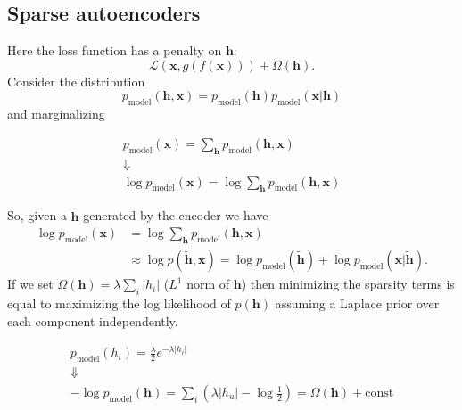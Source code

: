 \documentclass[a4paper,9pt]{extarticle}
\begin{document}
\begin{multicols*}{2}
		\subsection{Sparse autoencoders}
		Here the loss function has a penalty on $\mathbf{h}$:
		\begin{equation*}
			\mathcal{L}(\mathbf{x},g(f(\mathbf{x})))+\Omega(\mathbf{h}).
		\end{equation*}
		Consider the distribution
		\begin{equation*}
			p_{\mathrm{model}}(\mathbf{h},\mathbf{x})=	p_{\mathrm{model}}(\mathbf{h})	p_{\mathrm{model}}(\mathbf{x}|\mathbf{h})
		\end{equation*}
		and marginalizing
		\begin{riquadro}
			\begin{equation*}
				\begin{array}
{c}					p_{\mathrm{model}}(\mathbf{x})=\sum_{\mathbf{h}}	p_{\mathrm{model}}(\mathbf{h},\mathbf{x})\\
\Downarrow\\
\log p_{\mathrm{model}}(\mathbf{x})=\log\sum_{\mathbf{h}}	p_{\mathrm{model}}(\mathbf{h},\mathbf{x})
				\end{array}
		\end{equation*}
		\end{riquadro}
		So, given a $\widetilde{\mathbf{h}}$ generated by the encoder we have
		\begin{align*}
			\log p_{\mathrm{model}}(\mathbf{x})&=\log\sum_{\mathbf{h}}	p_{\mathrm{model}}(\mathbf{h},\mathbf{x})\\
			&\approx\log p(\widetilde{\mathbf{h}},\mathbf{x})=\log p_{\mathrm{model}}(\widetilde{\mathbf{h}})+\log p_{\mathrm{model}}(\mathbf{x}|\widetilde{\mathbf{h}}).
		\end{align*}
		If we set $\Omega(\mathbf{h})=\lambda\sum_{i}|h_i|$ ($L^{1}$ norm of $\mathbf{h}$) then minimizing the sparsity terms is equal to maximizing the log likelihood of $p(\mathbf{h})$ assuming a Laplace prior over each component independently.
		\begin{riquadro}
			\begin{equation*}
				\begin{array}{c}
					p_{\mathrm{model}}(h_{i})=\frac{\lambda}{2}e^{-\lambda|h_{i}|}\\
					\Downarrow\\
					-\log 	p_{\mathrm{model}}(\mathbf{h})=\sum_{i}\left(\lambda|h_{u}|-\log\frac{1}{2}\right)=\Omega(\mathbf{h})+\mathrm{const}
				\end{array}
			\end{equation*}
		\end{riquadro}

\end{multicols*}
\end{document}
